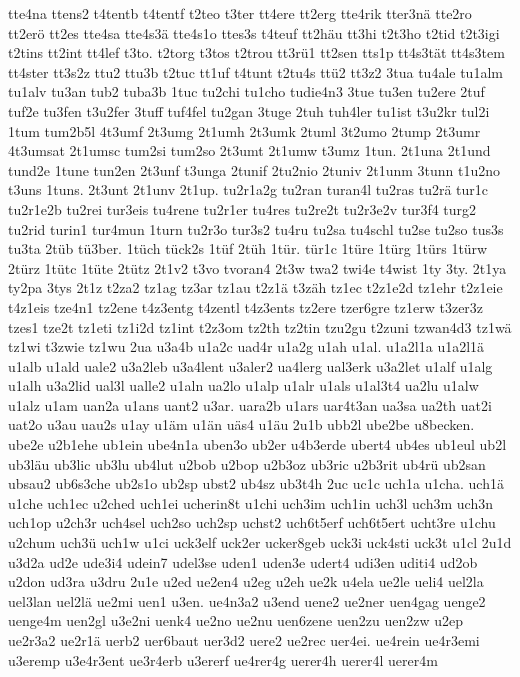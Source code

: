 {tte4na
ttens2
t4tentb
t4tentf
t2teo
t3ter
tt4ere
tt2erg
tte4rik
tter3nä
tte2ro
tt2erö
tt2es
tte4sa
tte4s3ä
tte4s1o
ttes3s
t4teuf
tt2häu
tt3hi
t2t3ho
t2tid
t2t3igi
t2tins
tt2int
tt4lef
t3to.
t2torg
t3tos
t2trou
tt3rü1
tt2sen
tts1p
tt4s3tät
tt4s3tem
tt4ster
tt3s2z
ttu2
ttu3b
t2tuc
tt1uf
t4tunt
t2tu4s
ttü2
tt3z2
3tua
tu4ale
tu1alm
tu1alv
tu3an
tub2
tuba3b
1tuc
tu2chi
tu1cho
tudie4n3
3tue
tu3en
tu2ere
2tuf
tuf2e
tu3fen
t3u2fer
3tuff
tuf4fel
tu2gan
3tuge
2tuh
tuh4ler
tu1ist
t3u2kr
tul2i
1tum
tum2b5l
4t3umf
2t3umg
2t1umh
2t3umk
2tuml
3t2umo
2tump
2t3umr
4t3umsat
2t1umsc
tum2si
tum2so
2t3umt
2t1umw
t3umz
1tun.
2t1una
2t1und
tund2e
1tune
tun2en
2t3unf
t3unga
2tunif
2tu2nio
2tuniv
2t1unm
3tunn
t1u2no
t3uns
1tuns.
2t3unt
2t1unv
2t1up.
tu2r1a2g
tu2ran
turan4l
tu2ras
tu2rä
tur1c
tu2r1e2b
tu2rei
tur3eis
tu4rene
tu2r1er
tu4res
tu2re2t
tu2r3e2v
tur3f4
turg2
tu2rid
turin1
tur4mun
1turn
tu2r3o
tur3s2
tu4ru
tu2sa
tu4schl
tu2se
tu2so
tus3s
tu3ta
2tüb
tü3ber.
1tüch
tück2s
1tüf
2tüh
1tür.
tür1c
1türe
1türg
1türs
1türw
2türz
1tütc
1tüte
2tütz
2t1v2
t3vo
tvoran4
2t3w
twa2
twi4e
t4wist
1ty
3ty.
2t1ya
ty2pa
3tys
2t1z
t2za2
tz1ag
tz3ar
tz1au
t2z1ä
t3zäh
tz1ec
t2z1e2d
tz1ehr
t2z1eie
t4z1eis
tze4n1
tz2ene
t4z3entg
t4zentl
t4z3ents
tz2ere
tzer6gre
tz1erw
t3zer3z
tzes1
tze2t
tz1eti
tz1i2d
tz1int
t2z3om
tz2th
tz2tin
tzu2gu
t2zuni
tzwan4d3
tz1wä
tz1wi
t3zwie
tz1wu
2ua
u3a4b
u1a2c
uad4r
u1a2g
u1ah
u1al.
u1a2l1a
u1a2l1ä
u1alb
u1ald
uale2
u3a2leb
u3a4lent
u3aler2
ua4lerg
ual3erk
u3a2let
u1alf
u1alg
u1alh
u3a2lid
ual3l
ualle2
u1aln
ua2lo
u1alp
u1alr
u1als
u1al3t4
ua2lu
u1alw
u1alz
u1am
uan2a
u1ans
uant2
u3ar.
uara2b
u1ars
uar4t3an
ua3sa
ua2th
uat2i
uat2o
u3au
uau2s
u1ay
u1äm
u1än
uäs4
u1äu
2u1b
ubb2l
ube2be
u8becken.
ube2e
u2b1ehe
ub1ein
ube4n1a
uben3o
ub2er
u4b3erde
ubert4
ub4es
ub1eul
ub2l
ub3läu
ub3lic
ub3lu
ub4lut
u2bob
u2bop
u2b3oz
ub3ric
u2b3rit
ub4rü
ub2san
ubsau2
ub6s3che
ub2s1o
ub2sp
ubst2
ub4sz
ub3t4h
2uc
uc1c
uch1a
u1cha.
uch1ä
u1che
uch1ec
u2ched
uch1ei
ucherin8t
u1chi
uch3im
uch1in
uch3l
uch3m
uch3n
uch1op
u2ch3r
uch4sel
uch2so
uch2sp
uchst2
uch6t5erf
uch6t5ert
ucht3re
u1chu
u2chum
uch3ü
uch1w
u1ci
uck3elf
uck2er
ucker8geb
uck3i
uck4sti
uck3t
u1cl
2u1d
u3d2a
ud2e
ude3i4
udein7
udel3se
uden1
uden3e
udert4
udi3en
uditi4
ud2ob
u2don
ud3ra
u3dru
2u1e
u2ed
ue2en4
u2eg
u2eh
ue2k
u4ela
ue2le
ueli4
uel2la
uel3lan
uel2lä
ue2mi
uen1
u3en.
ue4n3a2
u3end
uene2
ue2ner
uen4gag
uenge2
uenge4m
uen2gl
u3e2ni
uenk4
ue2no
ue2nu
uen6zene
uen2zu
uen2zw
u2ep
ue2r3a2
ue2r1ä
uerb2
uer6baut
uer3d2
uere2
ue2rec
uer4ei.
ue4rein
ue4r3emi
u3eremp
u3e4r3ent
ue3r4erb
u3ererf
ue4rer4g
uerer4h
uerer4l
uerer4m
}
